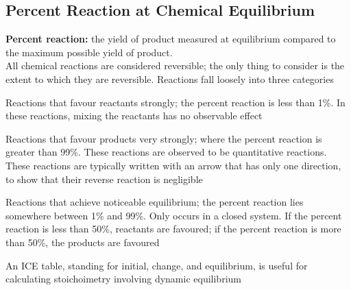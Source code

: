 \subsection{Percent Reaction at Chemical Equilibrium}
\textbf{Percent reaction:} the yield of product measured at equilibrium compared to the maximum 
possible yield of product.\\

All chemical reactions are considered reversible; the only thing to consider is the extent to which
they are reversible. Reactions fall loosely into three categories
\begin{bulleted-list}
    \item Reactions that favour reactants strongly; the percent reaction is less than
        1\%. In these reactions, mixing the reactants has no observable effect
    \item Reactions that favour products very strongly; where the percent reaction is greater than
        99\%. These reactions are observed to be quantitative reactions. These reactions are typically
        written with an arrow that has only one direction, to show that their reverse reaction is
        negligible
    \item Reactions that achieve noticeable equilibrium; the percent reaction lies somewhere
        between 1\% and 99\%. Only occurs in a closed system. If the percent reaction is less than
        50\%, reactants are favoured; if the percent reaction is more than 50\%, the products
        are favoured
    \item An ICE table, standing for initial, change, and equilibrium, is useful for calculating
        stoichoimetry involving dynamic equilibrium
\end{bulleted-list}
